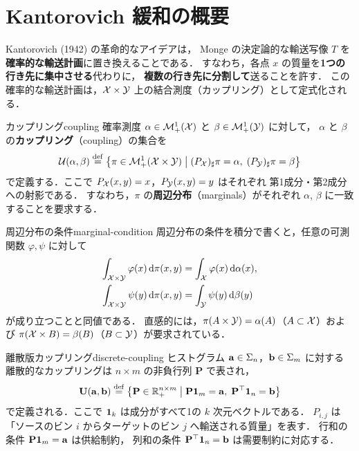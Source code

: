 \section{Kantorovich 緩和の概要}
\label{sec:kantorovich-overview}

Kantorovich (1942) の革命的なアイデアは，
Monge の決定論的な輸送写像 $T$ を\textbf{確率的な輸送計画}に置き換えることである．
すなわち，各点 $x$ の質量を\textbf{1つの行き先に集中させる}代わりに，
\textbf{複数の行き先に分割して}送ることを許す．
この確率的な輸送計画は，$\mathcal{X} \times \mathcal{Y}$ 上の結合測度（カップリング）として定式化される．

\begin{definition}{カップリング}{coupling}
  確率測度 $\alpha \in \mathcal{M}_+^1(\mathcal{X})$ と $\beta \in \mathcal{M}_+^1(\mathcal{Y})$ に対して，
  $\alpha$ と $\beta$ の\textbf{カップリング}（coupling）の集合を
  \[
    \mathcal{U}(\alpha, \beta) \overset{\mathrm{def}}{=}
    \left\{ \pi \in \mathcal{M}_+^1(\mathcal{X} \times \mathcal{Y}) \;\middle|\;
    (P_{\mathcal{X}})_\sharp \pi = \alpha, \;
    (P_{\mathcal{Y}})_\sharp \pi = \beta \right\}
  \]
  で定義する．ここで $P_{\mathcal{X}}(x, y) = x$，$P_{\mathcal{Y}}(x, y) = y$ はそれぞれ
  第1成分・第2成分への射影である．
  すなわち，$\pi$ の\textbf{周辺分布}（marginals）がそれぞれ $\alpha$, $\beta$ に一致することを要求する．
\end{definition}

\begin{remark}{周辺分布の条件}{marginal-condition}
  周辺分布の条件を積分で書くと，任意の可測関数 $\varphi, \psi$ に対して
  \begin{align*}
    \int_{\mathcal{X} \times \mathcal{Y}} \varphi(x) \, \mathrm{d}\pi(x, y) &= \int_{\mathcal{X}} \varphi(x) \, \mathrm{d}\alpha(x), \\
    \int_{\mathcal{X} \times \mathcal{Y}} \psi(y) \, \mathrm{d}\pi(x, y) &= \int_{\mathcal{Y}} \psi(y) \, \mathrm{d}\beta(y)
  \end{align*}
  が成り立つことと同値である．
  直感的には，$\pi(A \times \mathcal{Y}) = \alpha(A)$（$A \subset \mathcal{X}$）および
  $\pi(\mathcal{X} \times B) = \beta(B)$（$B \subset \mathcal{Y}$）が要求されている．
\end{remark}

\begin{remark}{離散版カップリング}{discrete-coupling}
  ヒストグラム $\mathbf{a} \in \Sigma_n$，$\mathbf{b} \in \Sigma_m$ に対する
  離散的なカップリングは $n \times m$ の非負行列 $\mathbf{P}$ で表され，
  \[
    \mathbf{U}(\mathbf{a}, \mathbf{b}) \overset{\mathrm{def}}{=}
    \left\{ \mathbf{P} \in \mathbb{R}_+^{n \times m} \;\middle|\;
    \mathbf{P} \mathbf{1}_m = \mathbf{a}, \;
    \mathbf{P}^\top \mathbf{1}_n = \mathbf{b} \right\}
  \]
  で定義される．ここで $\mathbf{1}_k$ は成分がすべて1の $k$ 次元ベクトルである．
  $P_{i,j}$ は「ソースのビン $i$ からターゲットのビン $j$ へ輸送される質量」を表す．
  行和の条件 $\mathbf{P} \mathbf{1}_m = \mathbf{a}$ は供給制約，
  列和の条件 $\mathbf{P}^\top \mathbf{1}_n = \mathbf{b}$ は需要制約に対応する．
\end{remark}

